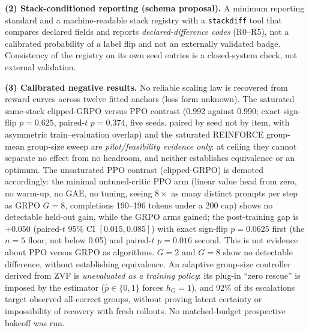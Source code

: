 \textbf{(2) Stack-conditioned reporting (schema proposal).} A minimum
reporting standard and a machine-readable stack registry with a
\texttt{stackdiff} tool that compares declared fields and reports
\emph{declared-difference codes} (R0--R5), not a calibrated probability of a
label flip and not an externally validated badge. Consistency of the registry
on its own seed entries is a closed-system check, not external validation.

\textbf{(3) Calibrated negative results.} No reliable scaling law is recovered
from reward curves across twelve fitted anchors (loss form unknown). The
saturated same-stack clipped-GRPO versus PPO contrast (0.992 against 0.990; exact sign-flip $p=0.625$, paired-$t$
$p=0.374$, five seeds, paired by seed not by item, with asymmetric
train--evaluation overlap) and the saturated REINFORCE group-mean group-size
sweep are
\emph{pilot/feasibility evidence only}: at ceiling they cannot separate no
effect from no headroom, and neither establishes equivalence or an optimum.
The unsaturated PPO contrast (clipped-GRPO) is demoted accordingly: the minimal
untuned-critic PPO arm (linear value head from zero, no warm-up, no GAE, no
tuning, seeing $8\times$ as many distinct prompts per step as GRPO $G=8$,
completions 190--196 tokens under a 200 cap) shows no detectable held-out
gain, while the GRPO arms gained; the post-training gap is $+0.050$
(paired-$t$ 95\% CI $[0.015, 0.085]$) with exact sign-flip $p=0.0625$ first
(the $n=5$ floor, not below 0.05) and paired-$t$ $p=0.016$ second. This is
not evidence about PPO versus GRPO as algorithms. $G = 2$ and $G = 8$ show no
detectable difference, without establishing equivalence. An adaptive
group-size controller derived from ZVF is \emph{unevaluated as a training
policy}: its plug-in ``zero rescue'' is imposed by the estimator
($\hat p\in\{0,1\}$ forces $h_G=1$), and 92\% of its escalations target
observed all-correct groups, without proving latent certainty or impossibility
of recovery with fresh rollouts. No matched-budget prospective bakeoff was run.

